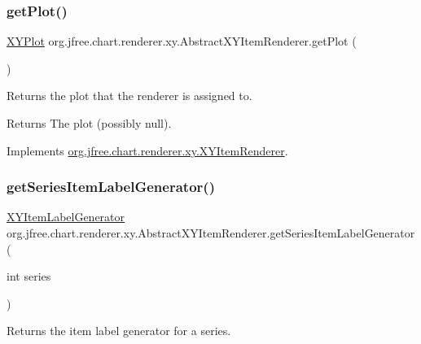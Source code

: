 \subsubsection{\texorpdfstring{get\+Plot()}{getPlot()}}
{\footnotesize\ttfamily \mbox{\hyperlink{classorg_1_1jfree_1_1chart_1_1plot_1_1_x_y_plot}{X\+Y\+Plot}} org.\+jfree.\+chart.\+renderer.\+xy.\+Abstract\+X\+Y\+Item\+Renderer.\+get\+Plot (\begin{DoxyParamCaption}{ }\end{DoxyParamCaption})}

Returns the plot that the renderer is assigned to.

\begin{DoxyReturn}{Returns}
The plot (possibly {\ttfamily null}). 
\end{DoxyReturn}


Implements \mbox{\hyperlink{interfaceorg_1_1jfree_1_1chart_1_1renderer_1_1xy_1_1_x_y_item_renderer_a28894e1e08c481201d49e6e87dde6568}{org.\+jfree.\+chart.\+renderer.\+xy.\+X\+Y\+Item\+Renderer}}.

\mbox{\label{classorg_1_1jfree_1_1chart_1_1renderer_1_1xy_1_1_abstract_x_y_item_renderer_a84c79d82b5bc9b856836ca5166a71b41}} 
\subsubsection{\texorpdfstring{get\+Series\+Item\+Label\+Generator()}{getSeriesItemLabelGenerator()}}
{\footnotesize\ttfamily \mbox{\hyperlink{interfaceorg_1_1jfree_1_1chart_1_1labels_1_1_x_y_item_label_generator}{X\+Y\+Item\+Label\+Generator}} org.\+jfree.\+chart.\+renderer.\+xy.\+Abstract\+X\+Y\+Item\+Renderer.\+get\+Series\+Item\+Label\+Generator (\begin{DoxyParamCaption}\item[{int}]{series }\end{DoxyParamCaption})}

Returns the item label generator for a series.


